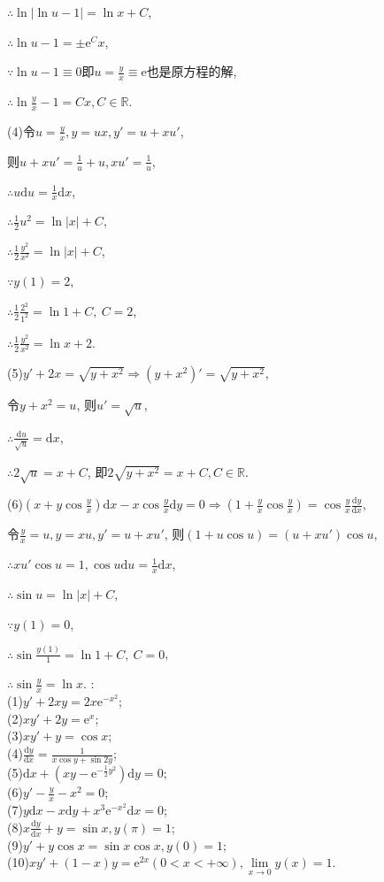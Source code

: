 \documentclass[12pt,UTF8,fleqn]{ctexart}
\newcommand{\md}[1]{\mathrm d#1}
\newcommand{\me}[0]{\mathrm e}
\begin{document}
\begin{enumerate}
$\therefore\ln|\ln u-1|=\ln x+C$,

$\therefore\ln u-1=\pm\me^Cx$,

$\because\ln u-1\equiv0$即$u=\frac yx\equiv\me$也是原方程的解,

$\therefore\ln\frac yx-1=Cx,C\in\mathbb R$.

(4)令$u=\frac yx,y=ux,y'=u+xu'$,

则$u+xu'=\frac1u+u,xu'=\frac1u$,

$\therefore u\md u=\frac1x\md x$,

$\therefore\frac12u^2=\ln|x|+C$,

$\therefore\frac12\frac{y^2}{x^2}=\ln|x|+C$,

$\because y(1)=2$,

$\therefore\frac12\frac{2^2}{1^2}=\ln1+C,\ C=2$,

$\therefore\frac12\frac{y^2}{x^2}=\ln x+2$.

(5)$y'+2x=\sqrt{y+x^2}\Rightarrow(y+x^2)'=\sqrt{y+x^2}$,

令$y+x^2=u$, 则$u'=\sqrt u$,

$\therefore\frac{\md u}{\sqrt u}=\md x$,

$\therefore2\sqrt u=x+C$, 即$2\sqrt{y+x^2}=x+C,C\in\mathbb R$.

(6)$(x+y\cos\frac yx)\md x-x\cos\frac yx\md y=0\Rightarrow(1+\frac yx\cos\frac yx)=\cos\frac yx\frac{\md y}{\md x}$,

令$\frac yx=u,y=xu,y'=u+xu'$, 则$(1+u\cos u)=(u+xu')\cos u$,

$\therefore xu'\cos u=1,\cos u\md u=\frac1x\md x$,

$\therefore\sin u=\ln|x|+C$,

$\because y(1)=0$,

$\therefore\sin\frac{y(1)}{1}=\ln1+C,\ C=0$,

$\therefore\sin\frac yx=\ln x$.
:\\
(1)$y'+2xy=2x\me^{-x^2}$;\\
(2)$xy'+2y=\me^x$;\\
(3)$xy'+y=\cos x$;\\
(4)$\frac{\md y}{\md x}=\frac1{x\cos y+\sin2y}$;\\
(5)$\md x+(xy-\me^{-\frac12y^2})\md y=0$;\\
(6)$y'-\frac yx-x^2=0$;\\
(7)$y\md x-x\md y+x^3\me^{-x^2}\md x=0$;\\
(8)$x\frac{\md y}{\md x}+y=\sin x,y(\pi)=1$;\\
(9)$y'+y\cos x=\sin x\cos x,y(0)=1$;\\
(10)$xy'+(1-x)y=\me^{2x}(0<x<+\infty),\lim\limits_{x\rightarrow0}y(x)=1$.


\end{enumerate}
\end{document}
